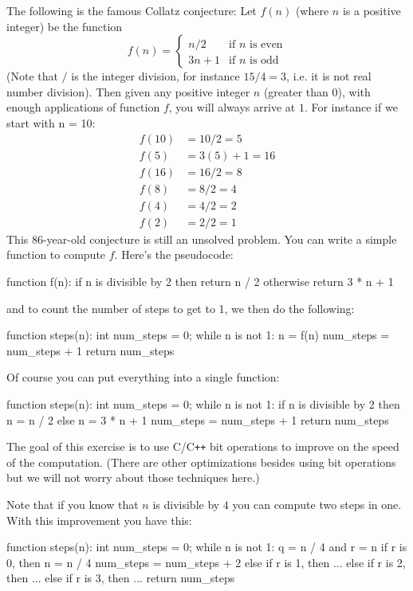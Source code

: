 The following is the famous Collatz conjecture:
Let $f(n)$ (where $n$ is a positive integer) be the function
\[
f(n) =
\begin{cases}
n / 2   & \text{if $n$ is even} \\
3n + 1  & \text{if $n$ is odd}
\end{cases}
\]
(Note that $/$ is the integer division,
for instance $15 / 4 = 3$, i.e. it is not real number division).
Then given
any positive integer $n$ (greater than $0$),
with enough applications of function $f$, you will always arrive at
$1$.
For instance if we start with n = 10:
\begin{align*}
f(10) &= 10 / 2 = 5 \\  
f( 5) &= 3(5) + 1 = 16 \\
f(16) &= 16 / 2 = 8 \\
f( 8) &= 8 / 2 = 4 \\
f( 4) &= 4 / 2 = 2 \\
f( 2) &= 2 / 2 = 1
\end{align*}
This 86-year-old conjecture is still an unsolved problem.
You can write a simple function to
compute $f$. Here's the pseudocode:
\begin{console}
function f(n):
    if n is divisible by 2 then
        return n / 2
    otherwise
        return 3 * n + 1
\end{console}
and to count the number of steps to get to 1, we then do the following:
\begin{console}
function steps(n):
    int num_steps = 0;
    while n is not 1:
        n = f(n)
        num_steps = num_steps + 1
    return num_steps
\end{console} 
Of course you can put everything into a single function:
\begin{console}
function steps(n):
    int num_steps = 0;
    while n is not 1:
        if n is divisible by 2 then
            n = n / 2
        else
            n = 3 * n + 1
        num_steps = num_steps + 1
    return num_steps
\end{console}
The goal of this exercise is to use C/C\texttt{++} bit operations to improve
on the speed of the computation.
(There are other optimizations besides using bit operations but we will not
worry about those
techniques here.)

Note that if you know that $n$ is divisible by $4$
you can compute two steps in one.
With this improvement you have this:
\begin{console}
function steps(n):
    int num_steps = 0;
    while n is not 1:
        q = n / 4 and r = n %
        if r is 0, then
            n = n / 4
            num_steps = num_steps + 2
        else if r is 1, then
            ...
        else if r is 2, then
            ...
        else if r is 3, then
            ...
    return num_steps
\end{console}

